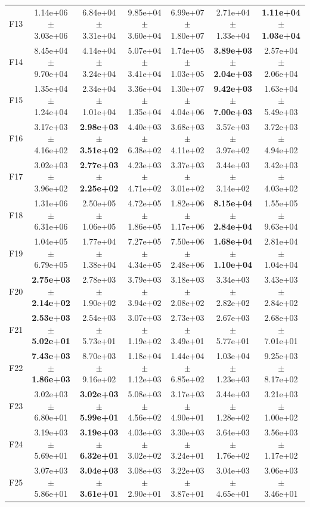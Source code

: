\begin{table}
{\begin{tabular}{lcccccc}
F13 & 1.14e+06 $\pm$ 3.03e+06 & 6.84e+04 $\pm$ 3.31e+04 & 9.85e+04 $\pm$ 3.60e+04 & 6.99e+07 $\pm$ 1.80e+07 & 2.71e+04 $\pm$ 1.33e+04 & \textbf{1.11e+04 $\pm$ 1.03e+04} \\
F14 & 8.45e+04 $\pm$ 9.70e+04 & 4.14e+04 $\pm$ 3.24e+04 & 5.07e+04 $\pm$ 3.41e+04 & 1.74e+05 $\pm$ 1.03e+05 & \textbf{3.89e+03 $\pm$ 2.04e+03} & 2.57e+04 $\pm$ 2.06e+04 \\
F15 & 1.35e+04 $\pm$ 1.24e+04 & 2.34e+04 $\pm$ 1.01e+04 & 3.36e+04 $\pm$ 1.35e+04 & 1.30e+07 $\pm$ 4.04e+06 & \textbf{9.42e+03 $\pm$ 7.00e+03} & 1.63e+04 $\pm$ 5.49e+03 \\
F16 & 3.17e+03 $\pm$ 4.16e+02 & \textbf{2.98e+03 $\pm$ 3.51e+02} & 4.40e+03 $\pm$ 6.38e+02 & 3.68e+03 $\pm$ 4.11e+02 & 3.57e+03 $\pm$ 3.97e+02 & 3.72e+03 $\pm$ 4.94e+02 \\
F17 & 3.02e+03 $\pm$ 3.96e+02 & \textbf{2.77e+03 $\pm$ 2.25e+02} & 4.23e+03 $\pm$ 4.71e+02 & 3.37e+03 $\pm$ 3.01e+02 & 3.44e+03 $\pm$ 3.14e+02 & 3.42e+03 $\pm$ 4.03e+02 \\
F18 & 1.31e+06 $\pm$ 6.31e+06 & 2.50e+05 $\pm$ 1.06e+05 & 4.72e+05 $\pm$ 1.86e+05 & 1.82e+06 $\pm$ 1.17e+06 & \textbf{8.15e+04 $\pm$ 2.84e+04} & 1.55e+05 $\pm$ 9.63e+04 \\
F19 & 1.04e+05 $\pm$ 6.79e+05 & 1.77e+04 $\pm$ 1.38e+04 & 7.27e+05 $\pm$ 4.34e+05 & 7.50e+06 $\pm$ 2.48e+06 & \textbf{1.68e+04 $\pm$ 1.10e+04} & 2.81e+04 $\pm$ 1.04e+04 \\
F20 & \textbf{2.75e+03 $\pm$ 2.14e+02} & 2.78e+03 $\pm$ 1.90e+02 & 3.79e+03 $\pm$ 3.94e+02 & 3.18e+03 $\pm$ 2.08e+02 & 3.34e+03 $\pm$ 2.82e+02 & 3.43e+03 $\pm$ 2.84e+02 \\
F21 & \textbf{2.53e+03 $\pm$ 5.02e+01} & 2.54e+03 $\pm$ 5.73e+01 & 3.07e+03 $\pm$ 1.19e+02 & 2.73e+03 $\pm$ 3.49e+01 & 2.67e+03 $\pm$ 5.77e+01 & 2.68e+03 $\pm$ 7.01e+01 \\
F22 & \textbf{7.43e+03 $\pm$ 1.86e+03} & 8.70e+03 $\pm$ 9.16e+02 & 1.18e+04 $\pm$ 1.12e+03 & 1.44e+04 $\pm$ 6.85e+02 & 1.03e+04 $\pm$ 1.23e+03 & 9.25e+03 $\pm$ 8.17e+02 \\
F23 & 3.02e+03 $\pm$ 6.80e+01 & \textbf{3.02e+03 $\pm$ 5.99e+01} & 5.08e+03 $\pm$ 4.56e+02 & 3.17e+03 $\pm$ 4.90e+01 & 3.44e+03 $\pm$ 1.28e+02 & 3.21e+03 $\pm$ 1.00e+02 \\
F24 & 3.19e+03 $\pm$ 5.69e+01 & \textbf{3.19e+03 $\pm$ 6.32e+01} & 4.03e+03 $\pm$ 3.02e+02 & 3.30e+03 $\pm$ 3.24e+01 & 3.64e+03 $\pm$ 1.76e+02 & 3.56e+03 $\pm$ 1.17e+02 \\
F25 & 3.07e+03 $\pm$ 5.86e+01 & \textbf{3.04e+03 $\pm$ 3.61e+01} & 3.08e+03 $\pm$ 2.90e+01 & 3.22e+03 $\pm$ 3.87e+01 & 3.04e+03 $\pm$ 4.65e+01 & 3.06e+03 $\pm$ 3.46e+01 \\

\end{tabular}}
\end{table}

